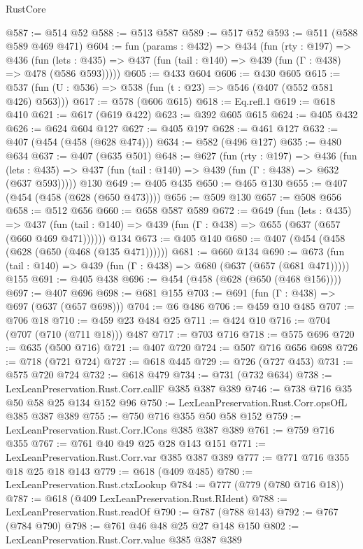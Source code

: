\begin{lexlean}{RustCore}
\begin{coremodule}
{\begin{coremodule}
{{{{{{@587 := @514 @52
@588 := @513 @587
@589 := @517 @52
@593 := @511 (@588 @589 @469 @471)
@604 := fun (params : @432) =>
  @434
    (fun (rty : @197) =>
    @436
      (fun (lets : @435) => @437 (fun (tail : @140) => @439 (fun (Γ : @438) => @478 (@586 @593)))))
@605 := @433 @604
@606 := @430 @605
@615 := @537 (fun (U : @536) => @538 (fun (t : @23) => @546 (@407 (@552 @581 @426) @563)))
@617 := @578 (@606 @615)
@618 := Eq.refl.{1}
@619 := @618 @410
@621 := @617 (@619 @422)
@623 := @392 @605 @615
@624 := @405 @432
@626 := @624 @604 @127
@627 := @405 @197
@628 := @461 @127
@632 := @407 (@454 (@458 (@628 @474)))
@634 := @582 (@496 @127)
@635 := @480 @634
@637 := @407 (@635 @501)
@648 := @627
    (fun (rty : @197) =>
    @436
      (fun (lets : @435) => @437 (fun (tail : @140) => @439 (fun (Γ : @438) => @632 (@637 @593)))))
    @130
@649 := @405 @435
@650 := @465 @130
@655 := @407 (@454 (@458 (@628 (@650 @473))))
@656 := @509 @130
@657 := @508 @656
@658 := @512 @656
@660 := @658 @587 @589
@672 := @649
    (fun (lets : @435) =>
    @437 (fun (tail : @140) => @439 (fun (Γ : @438) => @655 (@637 (@657 (@660 @469 @471))))))
    @134
@673 := @405 @140
@680 := @407 (@454 (@458 (@628 (@650 (@468 (@135 @471))))))
@681 := @660 @134
@690 := @673 (fun (tail : @140) => @439 (fun (Γ : @438) => @680 (@637 (@657 (@681 @471))))) @155
@691 := @405 @438
@696 := @454 (@458 (@628 (@650 (@468 @156))))
@697 := @407 @696
@698 := @681 @155
@703 := @691 (fun (Γ : @438) => @697 (@637 (@657 @698)))
@704 := @6 @486
@706 := @459 @10 @485
@707 := @706 @18
@710 := @459 @23 @484 @25
@711 := @424 @10
@716 := @704 (@707 (@710 (@711 @18))) @487
@717 := @703 @716
@718 := @575 @696
@720 := @635 (@500 @716)
@721 := @407 @720
@724 := @507 @716 @656 @698
@726 := @718 (@721 @724)
@727 := @618 @445
@729 := @726 (@727 @453)
@731 := @575 @720 @724
@732 := @618 @479
@734 := @731 (@732 @634)
@738 := LexLeanPreservation.Rust.Corr.callF @385 @387 @389
@746 := @738 @716 @35 @50 @58 @25 @134 @152 @96
@750 := LexLeanPreservation.Rust.Corr.opsOfL @385 @387 @389
@755 := @750 @716 @355 @50 @58 @152
@759 := LexLeanPreservation.Rust.Corr.lCons @385 @387 @389
@761 := @759 @716 @355
@767 := @761 @40 @49 @25 @28 @143 @151
@771 := LexLeanPreservation.Rust.Corr.var @385 @387 @389
@777 := @771 @716 @355 @18 @25 @18 @143
@779 := @618 (@409 @485)
@780 := LexLeanPreservation.Rust.ctxLookup
@784 := @777 (@779 (@780 @716 @18))
@787 := @618 (@409 LexLeanPreservation.Rust.RIdent)
@788 := LexLeanPreservation.Rust.readOf
@790 := @787 (@788 @143)
@792 := @767 (@784 @790)
@798 := @761 @46 @48 @25 @27 @148 @150
@802 := LexLeanPreservation.Rust.Corr.value @385 @387 @389
}}}}}}
\end{coremodule}}
\end{coremodule}
\end{lexlean}
